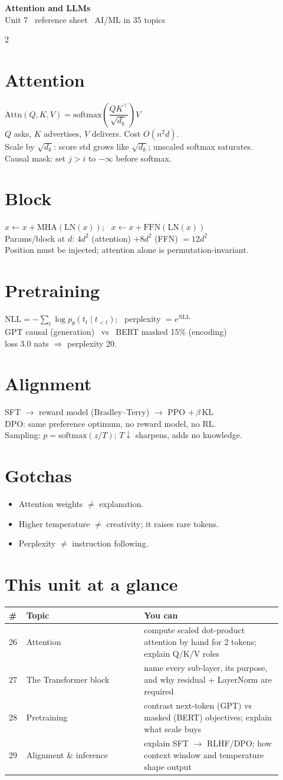 \documentclass[11pt,a4paper]{article}
\newcommand{\sect}[1]{\section*{#1}}
\newcommand{\hd}[2]{\begin{center}{\large\bfseries #1}\\[-0.1em]{\small\color{gray}#2}\end{center}\vspace{-0.6em}}
\begin{document}
\hd{Attention and LLMs}{Unit 7 \textperiodcentered\ reference sheet \textperiodcentered\ AI/ML in 35 topics}
\begin{multicols}{2}
\normalsize

\sect{Attention}
$\mathrm{Attn}(Q,K,V)=\mathrm{softmax}\!\left(\dfrac{QK^\top}{\sqrt{d_k}}\right)V$\\
$Q$ asks, $K$ advertises, $V$ delivers. Cost $O(n^2d)$.\\
Scale by $\sqrt{d_k}$: score std grows like $\sqrt{d_k}$; unscaled softmax saturates.\\
Causal mask: set $j>i$ to $-\infty$ before softmax.

\sect{Block}
$x\leftarrow x+\mathrm{MHA}(\mathrm{LN}(x))$; \ $x\leftarrow x+\mathrm{FFN}(\mathrm{LN}(x))$\\
Params/block at $d$: $4d^2$ (attention) $+8d^2$ (FFN) $=12d^2$\\
Position must be injected; attention alone is permutation-invariant.

\sect{Pretraining}
$\mathrm{NLL}=-\sum_t\log p_\theta(t_t\mid t_{<t})$; \ perplexity $=e^{\mathrm{NLL}}$\\
GPT causal (generation) \ vs \ BERT masked 15\% (encoding)\\
loss 3.0 nats $\Rightarrow$ perplexity 20.

\sect{Alignment}
SFT $\to$ reward model (Bradley--Terry) $\to$ PPO $+\,\beta\,\mathrm{KL}$\\
DPO: same preference optimum, no reward model, no RL.\\
Sampling: $p=\mathrm{softmax}(z/T)$; $T\downarrow$ sharpens, adds no knowledge.

\sect{Gotchas}
\begin{itemize}
\item Attention weights $\neq$ explanation.
\item Higher temperature $\neq$ creativity; it raises rare tokens.
\item Perplexity $\neq$ instruction following.
\end{itemize}

\sect{This unit at a glance}
\begin{tabular}{@{}p{0.05\linewidth}p{0.40\linewidth}p{0.47\linewidth}@{}}
\toprule
\# & Topic & You can\\
\midrule
26 & Attention & compute scaled dot-product attention by hand for 2 tokens; explain Q/K/V roles\\
27 & The Transformer block & name every sub-layer, its purpose, and why residual + LayerNorm are required\\
28 & Pretraining & contrast next-token (GPT) vs masked (BERT) objectives; explain what scale buys\\
29 & Alignment \& inference & explain SFT $\rightarrow$ RLHF/DPO; how context window and temperature shape output\\
\bottomrule
\end{tabular}


\end{multicols}
\end{document}
